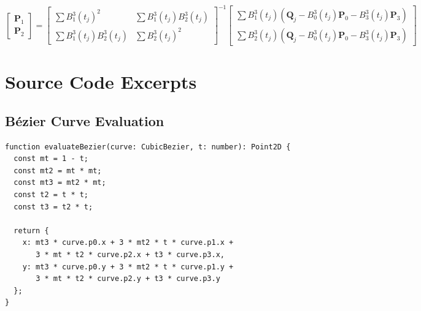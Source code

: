 \documentclass[12pt,a4paper]{article}
\begin{document}
\begin{equation}
\begin{bmatrix}
\mathbf{P}_1 \\
\mathbf{P}_2
\end{bmatrix}
=
\begin{bmatrix}
\sum B_1^3(t_j)^2 & \sum B_1^3(t_j)B_2^3(t_j) \\
\sum B_1^3(t_j)B_2^3(t_j) & \sum B_2^3(t_j)^2
\end{bmatrix}^{-1}
\begin{bmatrix}
\sum B_1^3(t_j)(\mathbf{Q}_j - B_0^3(t_j)\mathbf{P}_0 - B_3^3(t_j)\mathbf{P}_3) \\
\sum B_2^3(t_j)(\mathbf{Q}_j - B_0^3(t_j)\mathbf{P}_0 - B_3^3(t_j)\mathbf{P}_3)
\end{bmatrix}
\end{equation}

\section{Source Code Excerpts}

\subsection{Bézier Curve Evaluation}

\begin{verbatim}
function evaluateBezier(curve: CubicBezier, t: number): Point2D {
  const mt = 1 - t;
  const mt2 = mt * mt;
  const mt3 = mt2 * mt;
  const t2 = t * t;
  const t3 = t2 * t;
  
  return {
    x: mt3 * curve.p0.x + 3 * mt2 * t * curve.p1.x + 
       3 * mt * t2 * curve.p2.x + t3 * curve.p3.x,
    y: mt3 * curve.p0.y + 3 * mt2 * t * curve.p1.y + 
       3 * mt * t2 * curve.p2.y + t3 * curve.p3.y
  };
}
\end{verbatim}
\end{document}
